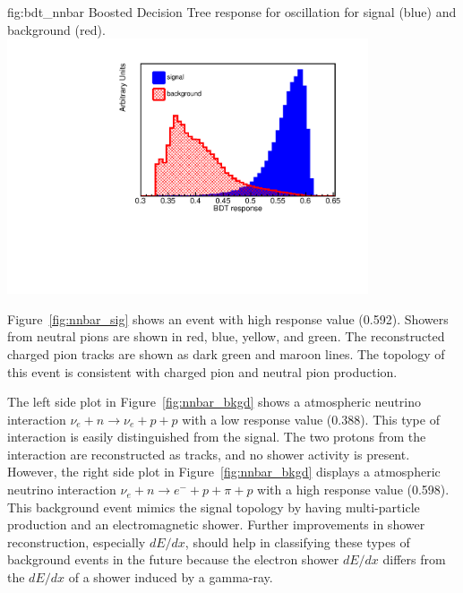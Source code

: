 \begin{dunefigure}
{fig:bdt_nnbar}
{Boosted Decision Tree response for \nnbar oscillation for signal (blue) and background (red).}
\includegraphics[width=0.8\textwidth]{graphics/BDT_nnbar.pdf}
\end{dunefigure} 

Figure~\ref{fig:nnbar_sig} shows an \nnbar event with high  response value (\num{0.592}). Showers from neutral pions are shown in red, blue, yellow, and green. The reconstructed charged pion tracks are shown as dark green and maroon lines. The topology of this event is consistent with charged pion and neutral pion production. 

The left side plot in Figure~\ref{fig:nnbar_bkgd} shows a  atmospheric neutrino interaction $\nu_{e}+n\rightarrow \nu_{e}+p+p$ with a low  response value (\num{0.388}). This type of interaction is easily distinguished from the signal.  The two protons from the  interaction are reconstructed as tracks, and no shower activity is present. However, the right side plot in Figure~\ref{fig:nnbar_bkgd} displays a  atmospheric neutrino interaction $\nu_{e}+n\rightarrow {e}^{-}+p+\pi +p$ with a high  response value (\num{0.598}). This background event mimics the signal topology by having multi-particle production and an electromagnetic shower. Further improvements in shower reconstruction, especially $dE/dx$, should help in classifying these types of background events in the future because the electron shower $dE/dx$ differs from the $dE/dx$ of a shower induced by a gamma-ray.

